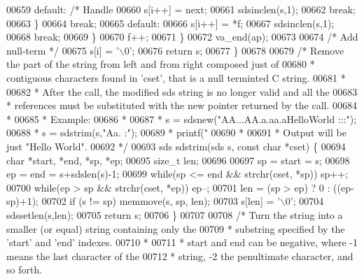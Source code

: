 \begin{DoxyCode}
{{{{{{{{{{{00659             \textcolor{keywordflow}{default}: \textcolor{comment}{/* Handle %
00660                 s[i++] = next;
00661                 sdsinclen(s,1);
00662                 \textcolor{keywordflow}{break};
00663             \}
00664             \textcolor{keywordflow}{break};
00665         \textcolor{keywordflow}{default}:
00666             s[i++] = *f;
00667             sdsinclen(s,1);
00668             \textcolor{keywordflow}{break};
00669         \}
00670         f++;
00671     \}
00672     va\_end(ap);
00673 
00674     \textcolor{comment}{/* Add null-term */}
00675     s[i] = \textcolor{stringliteral}{'\(\backslash\)0'};
00676     \textcolor{keywordflow}{return} s;
00677 \}
00678 
00679 \textcolor{comment}{/* Remove the part of the string from left and from right composed just of}
00680 \textcolor{comment}{ * contiguous characters found in 'cset', that is a null terminted C string.}
00681 \textcolor{comment}{ *}
00682 \textcolor{comment}{ * After the call, the modified sds string is no longer valid and all the}
00683 \textcolor{comment}{ * references must be substituted with the new pointer returned by the call.}
00684 \textcolor{comment}{ *}
00685 \textcolor{comment}{ * Example:}
00686 \textcolor{comment}{ *}
00687 \textcolor{comment}{ * s = sdsnew("AA...AA.a.aa.aHelloWorld     :::");}
00688 \textcolor{comment}{ * s = sdstrim(s,"Aa. :");}
00689 \textcolor{comment}{ * printf("%
00690 \textcolor{comment}{ *}
00691 \textcolor{comment}{ * Output will be just "Hello World".}
00692 \textcolor{comment}{ */}
00693 sds sdstrim(sds s, \textcolor{keyword}{const} \textcolor{keywordtype}{char} *cset) \{
00694     \textcolor{keywordtype}{char} *start, *end, *sp, *ep;
00695     size\_t len;
00696 
00697     sp = start = s;
00698     ep = end = s+sdslen(s)-1;
00699     \textcolor{keywordflow}{while}(sp <= end && strchr(cset, *sp)) sp++;
00700     \textcolor{keywordflow}{while}(ep > sp && strchr(cset, *ep)) ep--;
00701     len = (sp > ep) ? 0 : ((ep-sp)+1);
00702     \textcolor{keywordflow}{if} (s != sp) memmove(s, sp, len);
00703     s[len] = \textcolor{stringliteral}{'\(\backslash\)0'};
00704     sdssetlen(s,len);
00705     \textcolor{keywordflow}{return} s;
00706 \}
00707 
00708 \textcolor{comment}{/* Turn the string into a smaller (or equal) string containing only the}
00709 \textcolor{comment}{ * substring specified by the 'start' and 'end' indexes.}
00710 \textcolor{comment}{ *}
00711 \textcolor{comment}{ * start and end can be negative, where -1 means the last character of the}
00712 \textcolor{comment}{ * string, -2 the penultimate character, and so forth.}
}}}}}}}}}}}}}
\end{DoxyCode}
